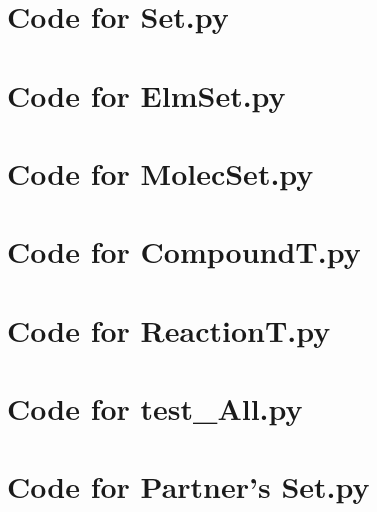 \documentclass[12pt]{article}
\begin{document}
\noindent 

\newpage

\section{Code for Set.py}

\noindent 

\newpage

\section{Code for ElmSet.py}

\noindent 

\newpage

\section{Code for MolecSet.py}

\noindent 

\newpage

\section{Code for CompoundT.py}

\noindent 

\newpage

\section{Code for ReactionT.py}

\noindent 

\newpage

\section{Code for test\_All.py}

\noindent 

\newpage

\section{Code for Partner's Set.py}

\noindent 
\end{document}
